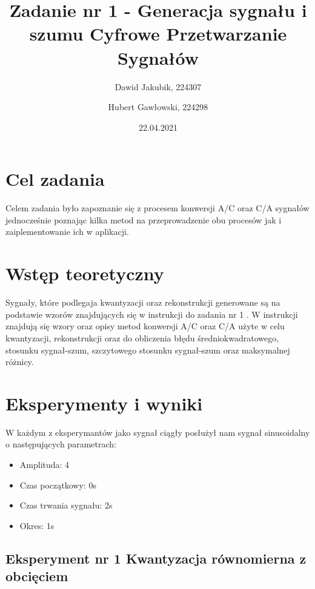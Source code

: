 \documentclass[12pt]{article}
\title{{\bf Zadanie nr 1 - Generacja sygnału i szumu}\linebreak
Cyfrowe Przetwarzanie Sygnałów}
\author{Dawid Jakubik, 224307 \and Hubert Gawłowski, 224298}
\date{22.04.2021}
\begin{document}
\clearpage\maketitle
\thispagestyle{empty}
\newpage
\setcounter{page}{1}
\section{Cel zadania}

Celem zadania było zapoznanie się z procesem konwersji A/C oraz C/A sygnałów jednocześnie poznając kilka metod na przeprowadzenie obu procesów jak i zaiplementowanie ich w aplikacji. 

\section{Wstęp teoretyczny}

Sygnały, które podlegaja kwantyzacji oraz rekonstrukcji generowane są na podstawie wzorów znajdujących się w instrukcji do zadania nr 1 \cite{instrukcja1}. W instrukcji \cite{instrukcji2} znajdują się wzory oraz opisy metod konwersji A/C oraz C/A użyte w celu kwantyzacji, rekonstrukcji oraz do obliczenia błędu średniokwadratowego, stosunku sygnał-szum, szczytowego stosunku sygnał-szum oraz maksymalnej różnicy.


\section{Eksperymenty i wyniki}

W każdym z eksperymantów jako sygnał ciągły posłużył nam sygnał sinusoidalny o następujących parametrach: 
\begin{itemize}
	\item Amplituda: 4
	\item Czas początkowy: 0s
	\item Czas trwania sygnału: 2s
	\item Okres: 1s
\end{itemize}

\subsection{Eksperyment nr 1 Kwantyzacja równomierna z obcięciem}
\end{document}

